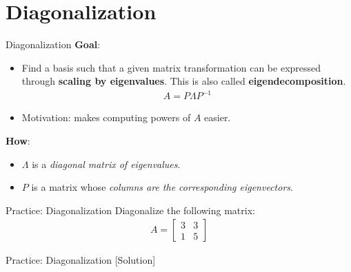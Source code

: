 \section{Diagonalization}

\begin{frame}{Diagonalization}
    \textbf{Goal}:\\[-1ex]
    \begin{itemize}
        \item Find a basis such that a given matrix transformation can be expressed through \textbf{scaling by eigenvalues}. This is also called \textbf{eigendecomposition}.
        \begin{align*}
            A = P \Lambda P^{-1}
        \end{align*}
        \item Motivation: makes computing powers of $A$ easier.
    \end{itemize}
    \textbf{How}:\\[-1ex]
    \begin{itemize}
        \item $\Lambda$ is a \textit{diagonal matrix of eigenvalues}.
        \item $P$ is a matrix whose \textit{columns are the corresponding eigenvectors}.
    \end{itemize}
\end{frame}

\begin{frame}{Practice: Diagonalization}
    Diagonalize the following matrix:
    \begin{align*}
        A = \begin{bmatrix}
            3 & 3 \\
            1 & 5
        \end{bmatrix}
    \end{align*}
\end{frame}

\begin{frame}{Practice: Diagonalization [Solution]}
\end{frame}

